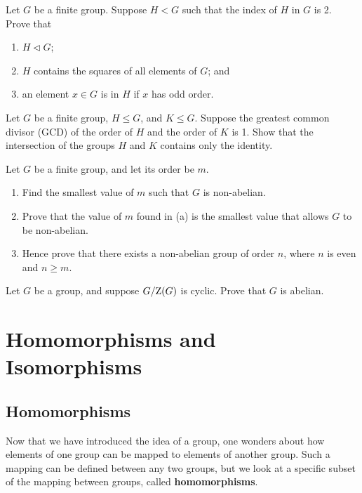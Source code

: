 \begin{problem}\label{problem-subgroup-of-index-2}
    Let $G$ be a finite group. Suppose $H < G$ such that the index of $H$ in $G$ is 2. Prove that
    \begin{enumerate}[label=(\roman*)]
        \item $H \lhd G$;
        \item $H$ contains the squares of all elements of $G$; and
        \item an element $x \in G$ is in $H$ if $x$ has odd order.
    \end{enumerate}
\end{problem}

\begin{problem}\label{problem-intersection-of-coprime-subgroups}
    Let $G$ be a finite group, $H \leq G$, and $K \leq G$. Suppose the greatest common divisor (GCD) of the order of $H$ and the order of $K$ is 1. Show that the intersection of the groups $H$ and $K$ contains only the identity.
\end{problem}

\begin{problem}\label{problem-smallest-nonabelian-group}
    Let $G$ be a finite group, and let its order be $m$.
    \begin{enumerate}[label=(\alph*)]
        \item Find the smallest value of $m$ such that $G$ is non-abelian.
        \item Prove that the value of $m$ found in (a) is the smallest value that allows $G$ to be non-abelian.
        \item Hence prove that there exists a non-abelian group of order $n$, where $n$ is even and $n \geq m$.
    \end{enumerate}
\end{problem}

\begin{problem}\label{problem-quotient-of-group-mod-center-is-cyclic-implies-abelian}
    Let $G$ be a group, and suppose $G / \mathrm{Z}(G)$ is cyclic. Prove that $G$ is abelian.
\end{problem}

\chapter{Homomorphisms and Isomorphisms}
\section{Homomorphisms}
Now that we have introduced the idea of a group, one wonders about how elements of one group can be mapped to elements of another group. Such a mapping can be defined between any two groups, but we look at a specific subset of the mapping between groups, called \textbf{homomorphisms}.


